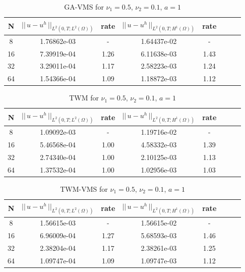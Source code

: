 \documentclass[10pt]{article}%
\numberwithin{equation}{section}
\begin{document}
\begin{table}[!ht]
	\caption{GA-VMS for $\nu_1 = 0.5$, $\nu_2 = 0.1$, $a = 1$}
	\begin{center} \label{table:GA-VMS}
		\begin{tabular}{|c|c|c|c|c|c|c|c|}
			\hline N  & $||\,u-u^h\,||_{L^2(0,T;L^2(\Omega))}$ & rate & $||\,u-u^h\,||_{L^2(0,T;H^1(\Omega))}$ & rate\\
			\hline 8  & 1.76862e-03 & -    & 1.64437e-02 & -    \\
			\hline 16 & 7.39919e-04 & 1.26 & 6.11638e-03 & 1.43 \\
			\hline 32 & 3.29011e-04 & 1.17 & 2.58223e-03 & 1.24 \\
			\hline 64 & 1.54366e-04 & 1.09 & 1.18872e-03 & 1.12 \\
			\hline
		\end{tabular}
	\end{center}
\end{table}
\begin{table}[!ht]
	\caption{TWM for $\nu_1 = 0.5$, $\nu_2 = 0.1$, $a = 1$}
	\begin{center} \label{table:TWM}
		\begin{tabular}{|c|c|c|c|c|c|c|c|}
			\hline N  & $||\,u-u^h\,||_{L^2(0,T;L^2(\Omega))}$ & rate & $||\,u-u^h\,||_{L^2(0,T;H^1(\Omega))}$ & rate\\
			\hline 8  & 1.09092e-03 & -    & 1.19716e-02 & -    \\
			\hline 16 & 5.46568e-04 & 1.00 & 4.58332e-03 & 1.39 \\
			\hline 32 & 2.74340e-04 & 1.00 & 2.10125e-03 & 1.13 \\
			\hline 64 & 1.37532e-04 & 1.00 & 1.02956e-03 & 1.03 \\
			\hline
		\end{tabular}
	\end{center}
\end{table}
\begin{table}[!ht]
	\caption{TWM-VMS for $\nu_1 = 0.5$, $\nu_2 = 0.1$, $a = 1$}
	\begin{center} \label{table:TWM-VMS}
		\begin{tabular}{|c|c|c|c|c|c|c|c|}
			\hline N  & $||\,u-u^h\,||_{L^2(0,T;L^2(\Omega))}$ & rate & $||\,u-u^h\,||_{L^2(0,T;H^1(\Omega))}$ & rate\\
			\hline 8  & 1.56615e-03 & -    & 1.56615e-02 & -    \\
			\hline 16 & 6.96009e-04 & 1.27 & 5.68593e-03 & 1.46 \\
			\hline 32 & 2.38204e-04 & 1.17 & 2.38261e-03 & 1.25 \\
			\hline 64 & 1.09747e-04 & 1.09 & 1.09747e-03 & 1.12 \\
			\hline
		\end{tabular}
	\end{center}
\end{table}
\end{document}
